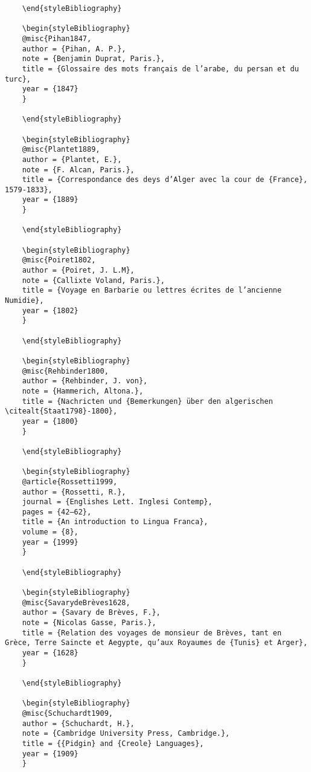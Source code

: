 \documentclass[output=paper]{langsci/langscibook}
\begin{document}
\begin{stylelsUnNumberedSection}
\begin{verbatim}
	\end{styleBibliography}
	
	\begin{styleBibliography}
	@misc{Pihan1847,
	author = {Pihan, A. P.},
	note = {Benjamin Duprat, Paris.},
	title = {Glossaire des mots français de l’arabe, du persan et du turc},
	year = {1847}
	}
	
	\end{styleBibliography}
	
	\begin{styleBibliography}
	@misc{Plantet1889,
	author = {Plantet, E.},
	note = {F. Alcan, Paris.},
	title = {Correspondance des deys d’Alger avec la cour de {France}, 1579-1833},
	year = {1889}
	}
	
	\end{styleBibliography}
	
	\begin{styleBibliography}
	@misc{Poiret1802,
	author = {Poiret, J. L.M},
	note = {Callixte Voland, Paris.},
	title = {Voyage en Barbarie ou lettres écrites de l’ancienne Numidie},
	year = {1802}
	}
	
	\end{styleBibliography}
	
	\begin{styleBibliography}
	@misc{Rehbinder1800,
	author = {Rehbinder, J. von},
	note = {Hammerich, Altona.},
	title = {Nachricten und {Bemerkungen} über den algerischen \citealt{Staat1798}-1800},
	year = {1800}
	}
	
	\end{styleBibliography}
	
	\begin{styleBibliography}
	@article{Rossetti1999,
	author = {Rossetti, R.},
	journal = {Englishes Lett. Inglesi Contemp},
	pages = {42–62},
	title = {An introduction to Lingua Franca},
	volume = {8},
	year = {1999}
	}
	
	\end{styleBibliography}
	
	\begin{styleBibliography}
	@misc{SavarydeBrèves1628,
	author = {Savary de Brèves, F.},
	note = {Nicolas Gasse, Paris.},
	title = {Relation des voyages de monsieur de Brèves, tant en Grèce, Terre Saincte et Aegypte, qu’aux Royaumes de {Tunis} et Arger},
	year = {1628}
	}
	
	\end{styleBibliography}
	
	\begin{styleBibliography}
	@misc{Schuchardt1909,
	author = {Schuchardt, H.},
	note = {Cambridge University Press, Cambridge.},
	title = {{Pidgin} and {Creole} Languages},
	year = {1909}
	}
	

\end{verbatim}
\end{stylelsUnNumberedSection}
\end{document}
